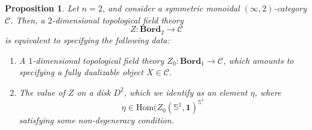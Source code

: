 \documentclass[a4paper,11pt]{article}
\newcommand{\Hom}{\mathrm{Hom}}
\newcommand{\ccal}{\mathcal{C}}
\theoremstyle{plain}
\newtheorem{prop}[thm]{Proposition}
\theoremstyle{definition}
\theoremstyle{remark}
\begin{document}
\begin{prop}
Let $n = 2$, and consider a symmetric monoidal $(\infty, 2)$-category $\ccal$. Then, a $2$-dimensional topological field theory 
$$Z \colon \textbf{Bord}_2 \to \ccal$$
is equivalent to specifying the following data:
\begin{enumerate}[label = \arabic*)]
    \item A $1$-dimensional topological field theory $Z_0 \colon \textbf{Bord}_1 \to \ccal$, which amounts to specifying a fully dualizable object $X \in \ccal$. 
    \item The value of $Z$ on a disk $D^2$, which we identify as an element $\eta$, where 
    $$\eta \in \Hom(Z_0(\mathbb{S}^1, \mathbf{1})^{\mathbb{S}^1} \, $$
    satisfying some non-degeneracy condition. 
\end{enumerate}
\end{prop}
\end{document}
